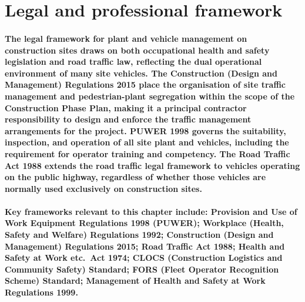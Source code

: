 
\section{Legal and professional framework}

\paragraph{The legal framework for plant and vehicle management on construction sites draws on both occupational health and safety legislation and road traffic law, reflecting the dual operational environment of many site vehicles. The Construction (Design and Management) Regulations 2015 place the organisation of site traffic management and pedestrian-plant segregation within the scope of the Construction Phase Plan, making it a principal contractor responsibility to design and enforce the traffic management arrangements for the project. PUWER 1998 governs the suitability, inspection, and operation of all site plant and vehicles, including the requirement for operator training and competency. The Road Traffic Act 1988 extends the road traffic legal framework to vehicles operating on the public highway, regardless of whether those vehicles are normally used exclusively on construction sites.}

\paragraph{Key frameworks relevant to this chapter include: Provision and Use of Work Equipment Regulations 1998 (PUWER); Workplace (Health, Safety and Welfare) Regulations 1992; Construction (Design and Management) Regulations 2015; Road Traffic Act 1988; Health and Safety at Work etc.\ Act 1974; CLOCS (Construction Logistics and Community Safety) Standard; FORS (Fleet Operator Recognition Scheme) Standard; Management of Health and Safety at Work Regulations 1999.}

